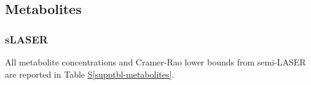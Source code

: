 \documentclass[
true
]{sn-jnl}
\newcommand*\quartosupptblref[1]{Table \hyperref[#1]{S\ref{#1}}}
\begin{document}
\subsection*{Metabolites}\label{metabolites}

\subsubsection*{sLASER}\label{slaser}

All metabolite concentrations and Cramer-Rao lower bounds from
semi-LASER are reported in \quartosupptblref{supptbl-metabolites}.

\begin{supptbl}

\centering{

}
\end{supptbl}
\end{document}
